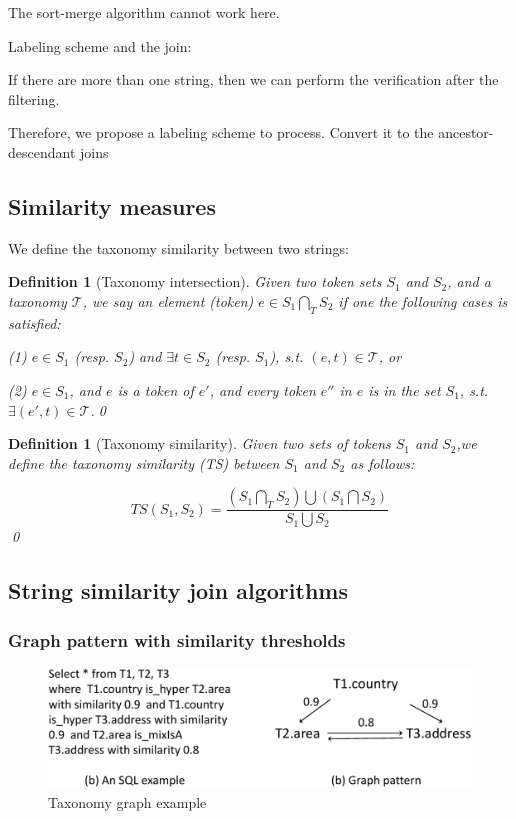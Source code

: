 \documentclass{sig-alternate}
\newtheorem{defi}[theorem]{Definition}
\newif\ifqedwritten
\newenvironment{definition}[1][]{\begin{defi}[#1]\upshape\qedwrittenfalse}{\qedhere\end{defi}}
\newcommand{\qedhere}{\ifqedwritten\else\ifmmode\tag*{\qed}\else\hfill\qed\fi\global\qedwrittentrue\fi}
\begin{document}
The sort-merge algorithm cannot work here.

Labeling scheme and the join:

If there are more than one string, then we can perform the verification after the filtering.


 Therefore, we propose a labeling scheme to process. Convert it to the ancestor-descendant joins



\subsection{Similarity measures}



We define the taxonomy similarity between two strings:

\begin{definition}[Taxonomy intersection]
Given two token sets $S_1$ and $S_2$, and a taxonomy $\mathcal{T}$, we say an element (token) $e \in S_1 \bigcap_T S_2$ if one the following cases is satisfied:

(1) $ e \in S_1$ (resp. $S_2$) and $\exists t \in S_2$ (resp. $S_1$), s.t. $(e,t) \in \mathcal{T} $, or

(2) $ e \in S_1$, and $e$ is a token of $e'$, and every token $e''$ in $e$ is in the set $S_1$, s.t. $\exists (e',t) \in \mathcal{T}$.\end{definition}

\begin{definition}[Taxonomy similarity]   Given two sets of tokens $S_1$ and $S_2$,we define the taxonomy similarity (TS) between $S_1$ and $S_2$ as follows:

\begin{equation}
TS(S_1,S_2)=  \frac{(S_1 \bigcap_T S_2) \bigcup (S_1 \bigcap S_2) }{S_1 \bigcup S_2}
\end{equation} \end{definition}

\subsection{String similarity join algorithms}

\subsubsection{Graph pattern with similarity thresholds}

\begin{figure}[t]
\centering
\includegraphics[scale=0.4]{figures/tgsql2}
 \caption{Taxonomy graph example }
\label{fig:similaritygeaph}
\end{figure}
\end{document}
